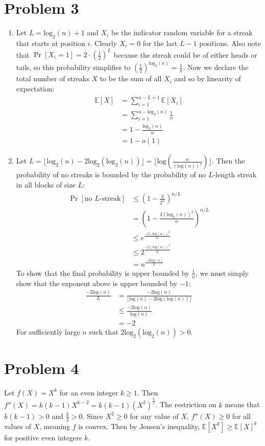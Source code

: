 \documentclass[11pt]{article}
\newcommand{\E}{\mathbb{E}}
\newcommand{\p}[1]{\left(#1\right)}
\renewcommand{\log}[1]{\text{log}\p{#1}}
\newcommand{\logb}[2]{\text{log}_{#1}\p{#2}}
\begin{document}
\newpage
\section*{Problem 3}
\begin{enumerate}[1.]
\item Let $L=\logb2n+1$ and $X_i$ be the indicator random variable for a streak that starts at position $i$. Clearly $X_i=0$ for the last $L-1$ positions. Also note that $\Pr[X_i=1]=2\cdot(\frac12)^L$ because the streak could be of either heads or tails, so this probability simplifies to $(\frac12)^{\logb2n}=\frac1n$. Now we declare the total number of streaks $X$ to be the sum of all $X_i$ and so by linearity of expectation: \begin{align*}
\E[X] &= \sum_{i=1}^{n-L+1} \E[X_i]\\
&= \sum_{i=1}^{n-\logb2n} \frac1n\\
&= 1-\frac{\logb2n}n\\
&= 1-o(1)
\end{align*}
\item Let $L=\lfloor\logb2n-2\logb2{\logb2n}\rfloor = \lfloor\log{\frac n{(\log n)^2}}\rfloor$. Then the probability of no streaks is bounded by the probability of no $L$-length streak in all blocks of size $L$: \begin{align*}
\Pr[\text{no }L\text{-streak}] &\leq (1-\frac2{2^L})^{n/L}\\
&= (1-\frac{2(\logb2n)^2}n)^{n/L}\\
&\leq e^{\frac{-2(\log n)^2}L}\\
&\leq 2^{\frac{-2(\log n)^2}L}\\
&= n^{\frac{-2\log n}L}
\end{align*}
To show that the final probability is upper bounded by $\frac1n$, we must simply show that the exponent above is upper bounded by $-1$: \begin{align*}
\frac{-2\log n}L &= \frac{-2\log n}{\lfloor\log n-2\log{\log n}\rfloor}\\
&\leq \frac{-2\log n}{\log n}\\
&= -2
\end{align*}
For sufficiently large $n$ such that $2\logb2{\logb2n}>0$.
\end{enumerate}


\newpage
\section*{Problem 4}
Let $f(X)=X^k$ for an even integer $k\geq 1$. Then $f''(X)=k(k-1)X^{k-2} = k(k-1)(X^2)^\frac k2$. The restriction on $k$ means that $k(k-1)>0$ and $\frac k2 > 0$. Since $X^2 \geq 0$ for any value of $X$, $f''(X) \geq 0$ for all values of $X$, meaning $f$ is convex. Then by Jensen's inequality, $\E[X^k] \geq \E[X]^k$ for positive even integers $k$.
\end{document}
